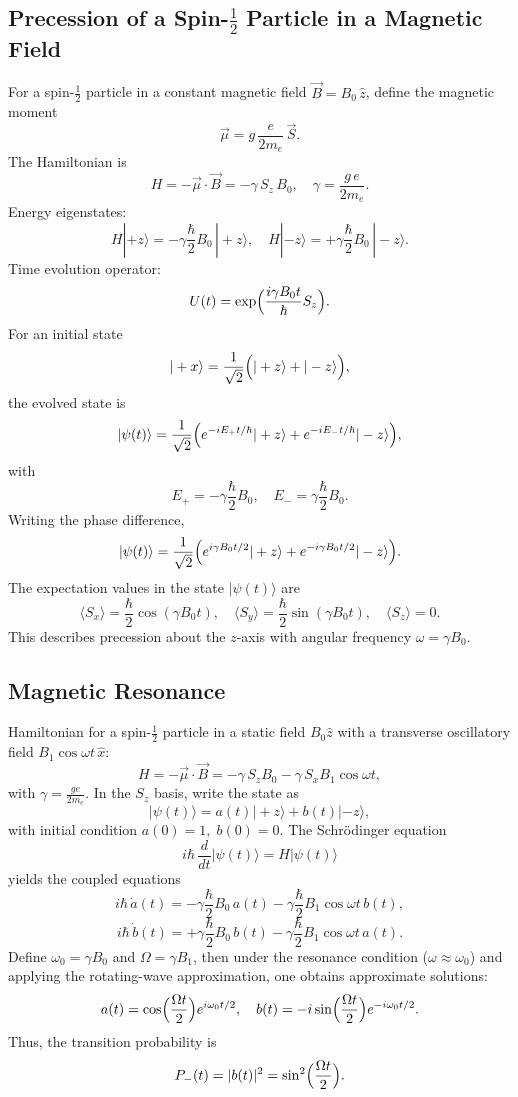 \documentclass[twocolumn]{article}
\begin{document}
\begin{spacing}{1}
\subsection{Precession of a Spin-\(\frac{1}{2}\) Particle in a Magnetic Field}
For a spin-\(\frac{1}{2}\) particle in a constant magnetic field \(\vec{B}=B_0\,\hat{z}\), define the magnetic moment
\[
\vec{\mu} = g\,\frac{e}{2m_e}\,\vec{S}.
\]
The Hamiltonian is
\[
H=-\vec{\mu}\cdot\vec{B}=-\gamma\,S_z\,B_0,\quad \gamma=\frac{g\,e}{2m_e}.
\]
Energy eigenstates:
\[
H|+z\rangle=-\gamma\frac{\hbar}{2}B_0\,|+z\rangle,\quad H|-z\rangle=+\gamma\frac{\hbar}{2}B_0\,|-z\rangle.
\]
Time evolution operator:
\[
U(t)=\exp\Bigl(\frac{i\gamma B_0t}{\hbar}S_z\Bigr).
\]
For an initial state
\[
|+x\rangle=\frac{1}{\sqrt{2}}\Bigl(|+z\rangle+|-z\rangle\Bigr),
\]
the evolved state is
\[
|\psi(t)\rangle=\frac{1}{\sqrt{2}}\Bigl(e^{-iE_+t/\hbar}|+z\rangle+e^{-iE_-t/\hbar}|-z\rangle\Bigr),
\]
with
\[
E_+=-\gamma\frac{\hbar}{2}B_0,\quad E_-=\gamma\frac{\hbar}{2}B_0.
\]
Writing the phase difference,
\[
|\psi(t)\rangle=\frac{1}{\sqrt{2}}\Bigl(e^{i\gamma B_0t/2}|+z\rangle+e^{-i\gamma B_0t/2}|-z\rangle\Bigr).
\]
The expectation values in the state \( |\psi(t)\rangle \) are
\[
\langle S_x\rangle=\frac{\hbar}{2}\cos(\gamma B_0t),\quad \langle S_y\rangle=\frac{\hbar}{2}\sin(\gamma B_0t),\quad \langle S_z\rangle=0.
\]
This describes precession about the \(z\)-axis with angular frequency \(\omega=\gamma B_0\).

\subsection{Magnetic Resonance}
Hamiltonian for a spin-$\frac{1}{2}$ particle in a static field $B_0\hat{z}$ with a transverse oscillatory field $B_1\cos\omega t\,\hat{x}$:
\[
H=-\vec{\mu}\cdot\vec{B}=-\gamma\,S_zB_0-\gamma\,S_xB_1\cos\omega t,
\]
with $\gamma=\frac{ge}{2m_e}$. In the $S_z$ basis, write the state as
\[
|\psi(t)\rangle=a(t)|+z\rangle+b(t)|-z\rangle,
\]
with initial condition $a(0)=1,\;b(0)=0$. The Schrödinger equation
\[
i\hbar\,\frac{d}{dt}|\psi(t)\rangle=H|\psi(t)\rangle
\]
yields the coupled equations
\[
i\hbar\,\dot{a}(t)=-\gamma\frac{\hbar}{2}B_0\,a(t)-\gamma\frac{\hbar}{2}B_1\cos\omega t\,b(t),
\]
\[
i\hbar\,\dot{b}(t)=+\gamma\frac{\hbar}{2}B_0\,b(t)-\gamma\frac{\hbar}{2}B_1\cos\omega t\,a(t).
\]
Define $\omega_0=\gamma B_0$ and $\Omega=\gamma B_1$, then under the resonance condition ($\omega\approx\omega_0$) and applying the rotating-wave approximation, one obtains approximate solutions:
\[
a(t)=\cos\Bigl(\frac{\Omega t}{2}\Bigr)e^{i\omega_0t/2},\quad
b(t)=-i\sin\Bigl(\frac{\Omega t}{2}\Bigr)e^{-i\omega_0t/2}.
\]
Thus, the transition probability is
\[
P_{-}(t)=|b(t)|^2=\sin^2\Bigl(\frac{\Omega t}{2}\Bigr).
\]


\end{spacing}
\end{document}
